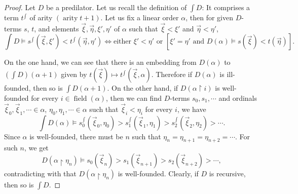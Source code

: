 \documentclass{mhkr}
\newcommand{\added}[1]{#1}
\newcommand{\field}{\operatorname{field}}
\newcommand{\arity}{\operatorname{arity}}
\begin{document}
\begin{proof}
    Let $D$ be a predilator. Let us recall the definition of $\int D$: It comprises a term $t^{\int}$ of arity $(\arity t+1)$. Let us fix a linear order $\alpha$, then for given $D$-terms $s$, $t$, and elements $\vec{\xi},\vec{\eta},\xi',\eta'$ of $\alpha$ such that $\vec{\xi}<\xi'$ and $\vec{\eta}<\eta'$,
    \begin{equation*} \textstyle
        \int D\vDash s^{\int}(\vec{\xi},\xi') < t^{\int}(\vec{\eta},\eta') \iff \text{either } \xi'<\eta' \text{ or }[\xi'=\eta' \text{ and } D(\alpha)\vDash s(\vec{\xi}) < t(\vec{\eta})].
    \end{equation*}

    On the one hand, we can see that there is an embedding from $D(\alpha)$ to $(\int D)(\alpha+1)$ given by $t(\vec{\xi}) \mapsto t^{\int}(\vec{\xi},\alpha)$.
    Therefore if $D(\alpha)$ is ill-founded, then so is $\int D(\alpha+1)$. 
    On the other hand, if $D(\alpha\restriction i)$ is well-founded for every $i\in \field(\alpha)$, then we can find $D$-terms $s_0,s_1,\cdots$ and ordinals $\vec{\xi}_0,\vec{\xi}_1,\cdots\in \alpha$, $\eta_0,\eta_1,\cdots\in \alpha$ \added{such that $\vec{\xi}_i <\eta_i$ for every $i$, we have}
    \begin{equation*}
        \textstyle \int D(\alpha)\vDash 
        s_0^{\int}(\vec{\xi}_0,\eta_0) >
        s_1^{\int}(\vec{\xi}_1,\eta_1) >
        s_2^{\int}(\vec{\xi}_2,\eta_2) > \cdots .
    \end{equation*}
    Since \added{$\alpha$ is well-founded}, there must be $n$ such that $\eta_n = \eta_{n+1} = \eta_{n+2} = \cdots$. For such $n$, we get
    \begin{equation*}
        D(\alpha\restriction \eta_n) \vDash 
        s_0(\vec{\xi}_n) >
        s_1(\vec{\xi}_{n+1}) >
        s_2(\vec{\xi}_{n+2}) > \cdots ,
    \end{equation*}
    contradicting with that $D(\alpha\restriction \eta_n)$ is well-founded.
    Clearly, if $D$ is recursive, then so is $\int D$.
\end{proof}
\end{document}
